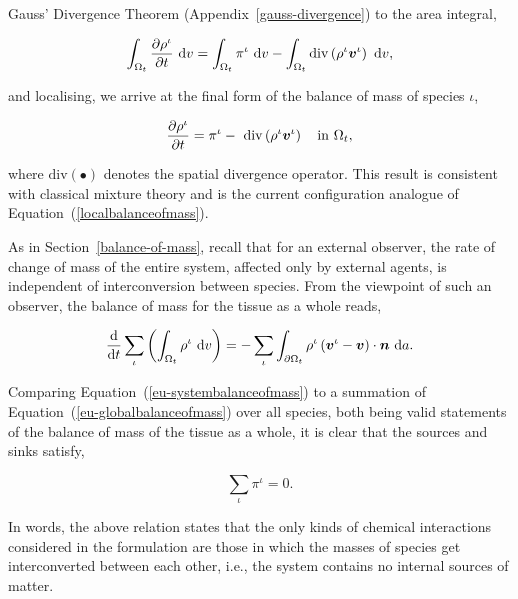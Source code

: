 \noindent Gauss' Divergence Theorem (Appendix~\ref{gauss-divergence})
to the area integral,

\begin{equation*}
\int_{\Omega_{t}} \frac{\partial \rho^{\iota}}{\partial t}
\ \mathrm{d}v = \int_{\Omega_{t}} \pi^{\iota} \ \mathrm{d}v -
\int_{\Omega_{t}} \mathrm{div} \left( \rho^{\iota} \mbox{\boldmath$ v$}^{\iota}\right)
\ \mathrm{d}v,
\end{equation*}

\noindent and localising, we arrive at the final form of the balance
of mass of species $\iota$,

\begin{equation}
\frac{\partial \rho^{\iota}}{\partial t} = \pi^{\iota} -\ \mathrm{div}
\left(\rho^{\iota} \mbox{\boldmath$ v$}^{\iota}\right) \quad \mathrm{in}\ \Omega_{t},
\label{eu-localbalanceofmass}
\end{equation}

\noindent where $\mathrm{div} (\bullet)$ denotes the spatial
divergence operator. This result is consistent with classical mixture
theory \citep{TruesdellToupin:60} and is the current configuration
analogue of Equation~(\ref{localbalanceofmass}).

As in Section~\ref{balance-of-mass}, recall that for an external
observer, the rate of change of mass of the entire system, affected
only by external agents, is independent of interconversion between
species. From the viewpoint of such an observer, the balance of mass
for the tissue as a whole reads,

\begin{equation}
\frac{\mathrm{\mathrm{d}}}{\mathrm{\mathrm{d}}t} \sum\limits_{\iota}
\left(\int_{\Omega_{t}} \rho^{\iota} \ \mathrm{d}v \right) =
-\sum\limits_{\iota} \int_{\partial \Omega_{t}} \rho^{\iota}
\left(\mbox{\boldmath$ v$}^{\iota} - \mbox{\boldmath$ v$}\right) \cdot \mbox{\boldmath$ n$}\ \mathrm{d}a.
\label{eu-systembalanceofmass}
\end{equation}

\noindent Comparing Equation~(\ref{eu-systembalanceofmass}) to a
summation of Equation~(\ref{eu-globalbalanceofmass}) over all species,
both being valid statements of the balance of mass of the tissue as a
whole, it is clear that the sources and sinks satisfy,

\begin{equation}
\sum\limits_{\iota}\pi^{\iota} = 0.
\label{eu-summationrelationmass}
\end{equation}

\noindent In words, the above relation states that the only kinds of
chemical interactions considered in the formulation are those in which
the masses of species get interconverted between each other, i.e.,
the system contains no internal sources of matter.

